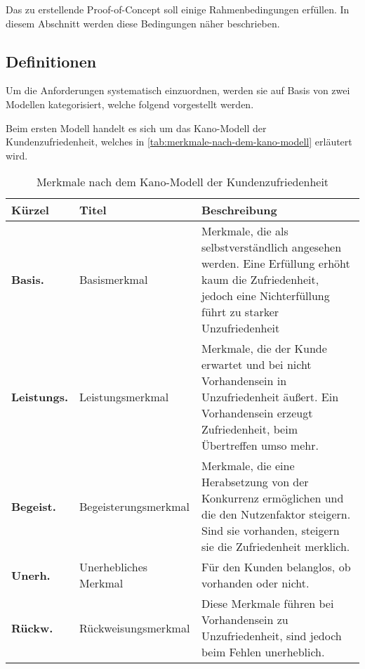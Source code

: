 
Das zu erstellende Proof-of-Concept soll einige Rahmenbedingungen erfüllen. In diesem Abschnitt werden diese Bedingungen näher beschrieben.
	
\subsection{Definitionen}
	
Um die Anforderungen systematisch einzuordnen, werden sie auf Basis von zwei Modellen kategorisiert, welche folgend vorgestellt werden.

Beim ersten Modell handelt es sich um das Kano-Modell \cite{KanoModell} der Kundenzufriedenheit, welches in  \autoref{tab:merkmale-nach-dem-kano-modell} erläutert wird.

\begin{table}[H]
\begin{tabular}{ |p{1.75cm}|p{2.40cm}|p{9.25cm}| }
	\hline
	Kürzel & Titel & Beschreibung \\
	\hline
	\textbf{Basis.} & Basis\-merkmal & Merkmale, die als selbstverständlich angesehen werden. Eine Erfüllung erhöht kaum die Zufriedenheit, jedoch eine Nichterfüllung führt zu starker Unzufriedenheit \\
	\hline
	\textbf{Leistungs.} & Leistungs\-merkmal & Merkmale, die der Kunde erwartet und bei nicht Vorhandensein in Unzufriedenheit äußert. Ein Vorhandensein erzeugt Zufriedenheit, beim Übertreffen umso mehr. \\
	\hline
	\textbf{Begeist.} & Begeisterungs\-merkmal & Merkmale, die eine Herabsetzung von der Konkurrenz ermöglichen und die den Nutzenfaktor steigern. Sind sie vorhanden, steigern sie die Zufriedenheit merklich. \\
	\hline
	\textbf{Unerh.} & Unerhebliches Merkmal & Für den Kunden belanglos, ob vorhanden oder nicht. \\
	\hline
	\textbf{Rückw.} & Rückweisungs\-merkmal & Diese Merkmale führen bei Vorhandensein zu Unzufriedenheit, sind jedoch beim Fehlen unerheblich. \\
	\hline
\end{tabular}
 \captionsetup{justification=centering}
  \caption{Merkmale nach dem Kano-Modell der Kundenzufriedenheit \cite{KanoModell}}
   \label{tab:merkmale-nach-dem-kano-modell}
\end{table}

